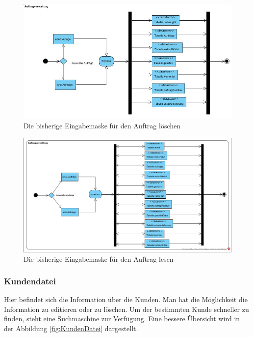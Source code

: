 \begin{figure}[h]
	\centering
	\includegraphics[width=1\linewidth]{Graphics/Autrag_Loeschen.JPG}
	\caption[AutragLoeschen]{Die bisherige Eingabemaske für den Auftrag löschen}
	\label{fig:Autrag_Loeschen}
\end{figure}
 
\begin{figure}[h] 
	\centering
	\includegraphics[width=1\linewidth]{Graphics/AuftragverwaltungEinsehen.png}
	\caption[auftragEinsehen]{Die bisherige Eingabemaske für den Auftrag lesen}
	\label{fig:auftragEinsehen}
\end{figure}

\pagebreak
\subsubsection{Kundendatei}

Hier befindet sich die Information über die Kunden. Man hat die Möglichkeit die Information zu editieren oder zu löschen. Um der bestimmten Kunde schneller zu finden, steht eine Suchmaschine zur Verfügung. Eine bessere Übersicht wird in der Abbildung \ref{fig:KundenDatei} dargestellt. 

